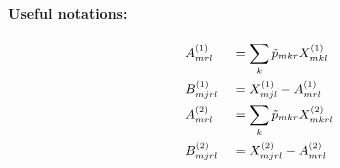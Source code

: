 \documentclass[12pt]{article}
\begin{document}
\paragraph{Useful notations: \\}
\begin{equation}
\small
\begin{aligned}
	& A^{(1)}_{mrl} && = \sum_k \tilde{p}_{mkr} X^{(1)}_{mkl} \\
	& B^{(1)}_{mjrl} && = X^{(1)}_{mjl} - A^{(1)}_{mrl}  \\
	& A^{(2)}_{mrl} && = \sum_k \tilde{p}_{mkr} X^{(2)}_{mkrl} \\
	& B^{(2)}_{mjrl} && = X^{(2)}_{mjrl} - A^{(2)}_{mrl}  \\
\end{aligned}
\end{equation}
\end{document}
